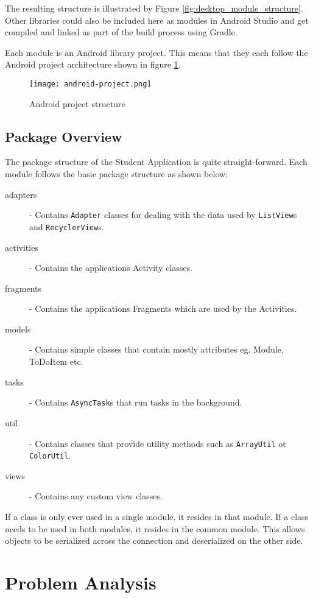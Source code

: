 The resulting structure is illustrated by Figure
\ref{fig:desktop_module_structure}. Other libraries could also be included here
as modules in Android Studio and get compiled and linked as part of the build
process using Gradle.

Each module is an Android library project. This means that they each follow the
Android project architecture shown in figure \ref{fig:android_project}.

\begin{figure}
    \centering
    \texttt{[image: android-project.png]}
    \caption{Android project structure}
    \label{fig:android_project}
\end{figure}

\subsection{Package Overview}

The package structure of the Student Application is quite straight-forward. Each
module follows the basic package structure as shown below:

\begin{description}
\item[adapters] - Contains \texttt{Adapter} classes for dealing with the data
    used by \texttt{ListView}s and \texttt{RecyclerView}s.
\item[activities] - Contains the applications Activity classes.
\item[fragments] - Contains the applications Fragments which are used by the
    Activities.
\item[models] - Contains simple classes that contain mostly attributes eg.
    Module, ToDoItem etc.
\item[tasks] - Contains \texttt{AsyncTask}s that run tasks in the background.
\item[util] - Contains classes that provide utility methods such as
    \texttt{ArrayUtil} ot \texttt{ColorUtil}.
\item[views] - Contains any custom view classes.
\end{description}

If a class is only ever used in a single module, it resides in that module. If
a class needs to be used in both modules, it resides in the common module. This
allows objects to be serialized across the connection and deserialized on the
other side.

\section{Problem Analysis}

